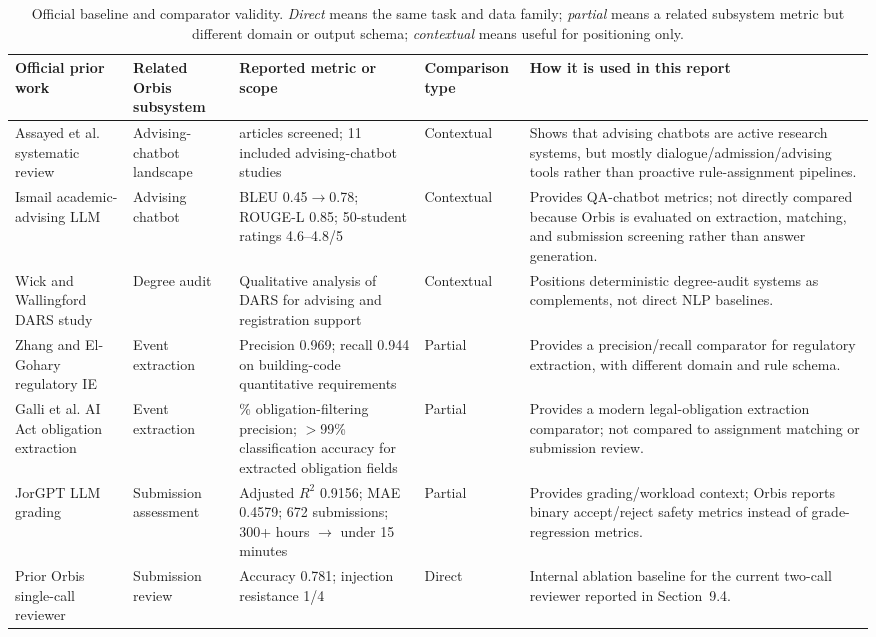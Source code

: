 \documentclass[a4paper,12pt]{article}
\begin{document}
\begin{table}[H]
\centering
\scriptsize
\begin{adjustbox}{width=\textwidth}
\begin{tabular}{>{\raggedright\arraybackslash}p{3.2cm}>{\raggedright\arraybackslash}p{2.5cm}>{\raggedright\arraybackslash}p{3.4cm}>{\raggedright\arraybackslash}p{2.2cm}>{\raggedright\arraybackslash}p{4.7cm}}
\toprule
\textbf{Official prior work} & \textbf{Related Orbis subsystem} & \textbf{Reported metric or scope} & \textbf{Comparison type} & \textbf{How it is used in this report} \\ \midrule
Assayed et al. systematic review \cite{assayed2024systematic} & Advising-chatbot landscape & 128 articles screened; 11 included advising-chatbot studies & Contextual & Shows that advising chatbots are active research systems, but mostly dialogue/admission/advising tools rather than proactive rule-assignment pipelines. \\
Ismail academic-advising LLM \cite{ismail2025academic} & Advising chatbot & BLEU 0.45$\rightarrow$0.78; ROUGE-L 0.85; 50-student ratings 4.6--4.8/5 & Contextual & Provides QA-chatbot metrics; not directly compared because Orbis is evaluated on extraction, matching, and submission screening rather than answer generation. \\
Wick and Wallingford DARS study \cite{wick2023dars} & Degree audit & Qualitative analysis of DARS for advising and registration support & Contextual & Positions deterministic degree-audit systems as complements, not direct NLP baselines. \\
Zhang and El-Gohary regulatory IE \cite{zhang2016semantic} & Event extraction & Precision 0.969; recall 0.944 on building-code quantitative requirements & Partial & Provides a precision/recall comparator for regulatory extraction, with different domain and rule schema. \\
Galli et al. AI Act obligation extraction \cite{galli2025aiAct} & Event extraction & 93\% obligation-filtering precision; $>$99\% classification accuracy for extracted obligation fields & Partial & Provides a modern legal-obligation extraction comparator; not compared to assignment matching or submission review. \\
JorGPT LLM grading \cite{cisneros2025jorgpt} & Submission assessment & Adjusted $R^2$ 0.9156; MAE 0.4579; 672 submissions; 300+ hours $\rightarrow$ under 15 minutes & Partial & Provides grading/workload context; Orbis reports binary accept/reject safety metrics instead of grade-regression metrics. \\
Prior Orbis single-call reviewer & Submission review & Accuracy 0.781; injection resistance 1/4 & Direct & Internal ablation baseline for the current two-call reviewer reported in Section~9.4. \\
\bottomrule
\end{tabular}
\end{adjustbox}
\caption{Official baseline and comparator validity. \emph{Direct} means the same task and data family; \emph{partial} means a related subsystem metric but different domain or output schema; \emph{contextual} means useful for positioning only.}
\label{tab:baseline_validity}
\end{table}
\end{document}
